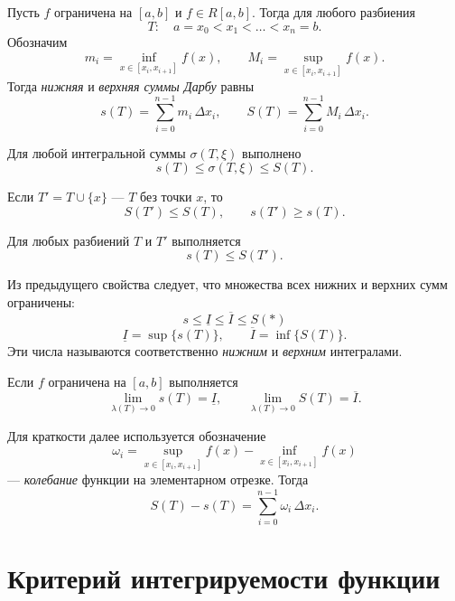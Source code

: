 \begin{definition}
Пусть $f$ ограничена на $[a,b]$ и $ f \in R[a,b]$. Тогда для любого разбиения
\[
T:\quad a=x_0<x_1<\dots<x_n=b.
\]
Обозначим
\[
 m_i=\inf\limits_{x\in[x_i,x_{i+1}]} f(x),\qquad
 M_i=\sup\limits_{x\in[x_i,x_{i+1}]} f(x).
\]
Тогда \emph{нижняя} и \emph{верхняя суммы Дарбу} равны
\[
 s(T)=\sum\limits_{i=0}^{n-1} m_i\,\Delta x_i,\qquad
 S(T)=\sum\limits_{i=0}^{n-1} M_i\,\Delta x_i.
\]
\end{definition}

\begin{prop}
Для любой интегральной суммы $\sigma(T,\xi)$ выполнено
\[
 s(T)\leqslant \sigma(T,\xi)\leqslant S(T).
\]
\end{prop}

\begin{prop}
Если $T' = T\cup\{x\}$ —  $T$ без точки $x$, то
\[
S(T')\leqslant S(T),\qquad s(T')\geqslant s(T).
\]
\end{prop}

\begin{prop}
Для любых разбиений $T$ и $T'$ выполняется
\[
 s(T)\leqslant S(T').
\]
\end{prop}

Из предыдущего свойства следует, что множества всех нижних и верхних сумм ограничены:
\[
\boxed{s \leqslant \underline I \leqslant \overline I \leqslant S} (*)
\]
\[
\underline I=\sup\{s(T)\},\qquad \overline I=\inf\{S(T)\}.
\]
Эти числа называются соответственно \emph{нижним} и \emph{верхним} интегралами.

\begin{theorem}
Если $f$ ограничена на $[a,b]$ выполняется
\[
\lim_{\lambda(T)\to 0}s(T)=\underline I,\qquad
\lim_{\lambda(T)\to 0}S(T)=\overline I.
\]
\end{theorem}

\begin{remark}
Для краткости далее используется обозначение
\[
\omega_i=\sup\limits_{x\in[x_i,x_{i+1}]}f(x)-\inf\limits_{x\in[x_i,x_{i+1}]}f(x)
\]
— \emph{колебание} функции на элементарном отрезке.
Тогда
\[
S(T)-s(T)=\sum\limits_{i=0}^{n-1}\omega_i\,\Delta x_i.
\]
\end{remark}


\section{Критерий интегрируемости функции}

